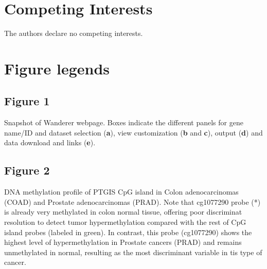 \documentclass{article}
\begin{document}
\section{Competing Interests}
The authors declare no competing interests.





\section{Figure legends}

\subsection{Figure 1}
Snapshot of Wanderer webpage. Boxes indicate the different panels for gene name/ID and dataset selection (\textbf{a}), view customization (\textbf{b} and \textbf{c}), output (\textbf{d}) and data download and links (\textbf{e}).

\subsection{Figure 2}
DNA methylation profile of PTGIS CpG island in Colon adenocarcinomas (COAD) and Prostate adenocarcinomas (PRAD). Note that cg1077290 probe (*) is already very methylated in colon normal tissue, offering poor discriminat resolution to detect tumor hypermethylation compared with the rest of CpG island probes (labeled in green). In contrast, this probe (cg1077290) shows the highest level of hypermethylation in Prostate cancers (PRAD) and remains unmethylated in normal, resulting as the most discriminant variable in tis type of cancer.





\end{document}
